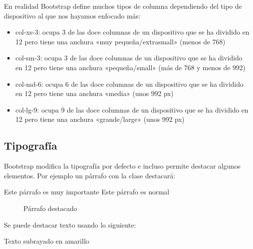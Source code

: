 \documentclass[letterpaper,10pt,spanish]{sphinxmanual}
\begin{document}
En realidad Bootstrap define muchos tipos de columna dependiendo del tipo de dispositivo al que nos hayamos enfocado más:
\begin{itemize}
\item {} 
col-xs-3: ocupa 3 de las doce columnas de un dispositivo que se ha dividido en 12 pero tiene una anchura «muy pequeña/extrasmall» (menos de 768)

\item {} 
col-sm-3: ocupa 3 de las doce columnas de un dispositivo que se ha dividido en 12 pero tiene una anchura «pequeña/small» (más de 768 y menos de 992)

\item {} 
col-md-6: ocupa 6 de las doce columnas de un dispositivo que se ha dividido en 12 pero tiene una anchura «media» (unos 992 px)

\item {} 
col-lg-9: ocupa 9 de las doce columnas de un dispositivo que se ha dividido en 12 pero tiene una anchura «grande/large» (unos 992 px)

\end{itemize}


\subsection{Tipografía}
\label{\detokenize{tema3:tipografia}}
Bootstrap modifica la tipografía por defecto e incluso permite destacar algunos elementos. Por ejemplo un párrafo con la clase  destacará:

\begin{sphinxVerbatim}[commandchars=\\\{\}]
     
            Este párrafo es muy importante
Este párrafo es normal
\end{sphinxVerbatim}

\begin{figure}[htbp]
\centering
\capstart

\noindent{}
\caption{Párrafo destacado}\label{\detokenize{tema3:id21}}\end{figure}

Se puede destacar texto usando lo siguiente:

\begin{sphinxVerbatim}[commandchars=\\\{\}]
Texto subrayado en amarillo
\end{sphinxVerbatim}
\end{document}
